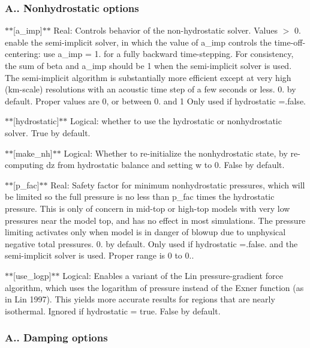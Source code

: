 \subsubsection*{A.. Nonhydrostatic options}

$\ast$$\ast$\mbox{[}a\-\_\-imp\mbox{]}$\ast$$\ast$ Real\-: Controls behavior of the non-\/hydrostatic solver. Values $>$ 0. enable the semi-\/implicit solver, in which the value of a\-\_\-imp controls the time-\/off-\/centering\-: use a\-\_\-imp = 1. for a fully backward time-\/stepping. For consistency, the sum of beta and a\-\_\-imp should be 1 when the semi-\/implicit solver is used. The semi-\/implicit algorithm is substantially more efficient except at very high (km-\/scale) resolutions with an acoustic time step of a few seconds or less. 0. by default. Proper values are 0, or between 0. and 1 Only used if hydrostatic =.false.

$\ast$$\ast$\mbox{[}hydrostatic\mbox{]}$\ast$$\ast$ Logical\-: whether to use the hydrostatic or nonhydrostatic solver. True by default.

$\ast$$\ast$\mbox{[}make\-\_\-nh\mbox{]}$\ast$$\ast$ Logical\-: Whether to re-\/initialize the nonhydrostatic state, by re-\/computing dz from hydrostatic balance and setting w to 0. False by default.

$\ast$$\ast$\mbox{[}p\-\_\-fac\mbox{]}$\ast$$\ast$ Real\-: Safety factor for minimum nonhydrostatic pressures, which will be limited so the full pressure is no less than p\-\_\-fac times the hydrostatic pressure. This is only of concern in mid-\/top or high-\/top models with very low pressures near the model top, and has no effect in most simulations. The pressure limiting activates only when model is in danger of blowup due to unphysical negative total pressures. 0. by default. Only used if hydrostatic =.false. and the semi-\/implicit solver is used. Proper range is 0 to 0..

$\ast$$\ast$\mbox{[}use\-\_\-logp\mbox{]}$\ast$$\ast$ Logical\-: Enables a variant of the Lin pressure-\/gradient force algorithm, which uses the logarithm of pressure instead of the Exner function (as in Lin 1997). This yields more accurate results for regions that are nearly isothermal. Ignored if hydrostatic = true. False by default.

\subsubsection*{A.. Damping options}


